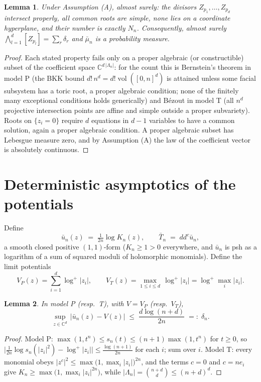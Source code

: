 \documentclass[12pt]{article}
\def\C{\mathbb{C}}
\def\ddc{dd^c}
\newtheorem{lemma}{Lemma}[section]
\begin{document}
\begin{lemma}\label{lem:generic}
Under Assumption (A), almost surely: the divisors $Z_{p_1},\dots,Z_{p_d}$ intersect
properly, all common roots are simple, none lies on a coordinate hyperplane, and their
number is exactly $N_n$. Consequently, almost surely
$\bigwedge_{l=1}^d [Z_{p_l}] = \sum_r \delta_r$ and $\bar\mu_n$ is a probability
measure.
\end{lemma}

\begin{proof}
Each stated property fails only on a proper algebraic (or constructible) subset of the
coefficient space $\C^{d\,|\Lambda_n|}$: for the count this is Bernstein's theorem
\cite{Ber75} in model P (the BKK bound $d!\,n^d = d!\operatorname{vol}([0,n]^d)$ is
attained unless some facial subsystem has a toric root, a proper algebraic condition;
none of the finitely many exceptional conditions holds generically) and B\'ezout in
model T (all $n^d$ projective intersection points are affine and simple outside a proper
subvariety). Roots on $\{z_i = 0\}$ require $d$ equations in $d-1$ variables to have a
common solution, again a proper algebraic condition. A proper algebraic subset has
Lebesgue measure zero, and by Assumption (A) the law of the coefficient vector is
absolutely continuous.
\end{proof}

\section{Deterministic asymptotics of the potentials}

Define
\[
  \bar u_n(z) \;=\; \tfrac{1}{2n} \log K_n(z), \qquad
  \bar T_n \;=\; \ddc \bar u_n ,
\]
a smooth closed positive $(1,1)$-form ($K_n \ge 1 > 0$ everywhere, and $\bar u_n$ is psh
as a logarithm of a sum of squared moduli of holomorphic monomials). Define the limit
potentials
\[
  V_P(z) = \sum_{i=1}^d \log^+ |z_i| , \qquad
  V_T(z) = \max_{1\le i\le d}\, \log^+ |z_i| = \log^+ \max_i |z_i| .
\]

\begin{lemma}\label{lem:potconv}
In model P (resp.\ T), with $V = V_P$ (resp.\ $V_T$),
\[
  \sup_{z \in \C^d}\, \bigl| \bar u_n(z) - V(z) \bigr| \;\le\; \frac{d \log (n+d)}{2n}
  \;=:\; \delta_n .
\]
\end{lemma}

\begin{proof}
Model P: $\max(1,t^n) \le s_n(t) \le (n+1)\max(1,t^n)$ for $t\ge0$, so
$\bigl|\frac{1}{2n}\log s_n(|z_i|^2) - \log^+|z_i|\bigr| \le \frac{\log(n+1)}{2n}$ for
each $i$; sum over $i$. Model T: every monomial obeys
$|z^c|^2 \le \max\bigl(1,\max_i|z_i|\bigr)^{2n}$, and the terms $c = 0$ and $c = n e_i$
give $K_n \ge \max\bigl(1, \max_i |z_i|^{2n}\bigr)$, while
$|\Lambda_n| = \binom{n+d}{d} \le (n+d)^d$.
\end{proof}
\end{document}
